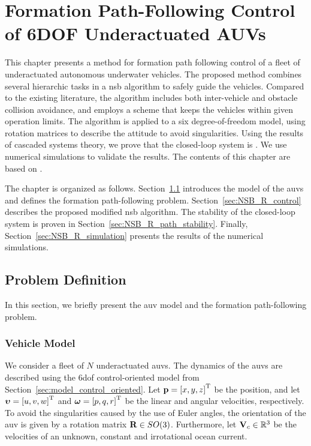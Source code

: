 \chapter{Formation Path-Following Control of 6DOF Underactuated AUVs}
\label{chap:NSB_R}

This chapter presents a method for formation path following control of a fleet of underactuated autonomous underwater vehicles.
The proposed method combines several hierarchic tasks in a \acrlong{nsb} algorithm to safely guide the vehicles.
Compared to the existing literature, the algorithm includes both inter-vehicle and obstacle collision avoidance, and employs a scheme that keeps the vehicles within given operation limits.
The algorithm is applied to a six degree-of-freedom model, using rotation matrices to describe the attitude to avoid singularities.
Using the results of cascaded systems theory, we prove that the closed-loop system is .
We use numerical simulations to validate the results.
The contents of this chapter are based on \cite{matous_singularity_2023}.

The chapter is organized as follows.
Section~\ref{sec:NSB_R_problem} introduces the model of the \glspl{auv} and defines the formation path-following problem.
Section~\ref{sec:NSB_R_control} describes the proposed modified \gls{nsb} algorithm.
The stability of the closed-loop system is proven in Section~\ref{sec:NSB_R_path_stability}.
Finally, Section~\ref{sec:NSB_R_simulation} presents the results of the numerical simulations.

\section{Problem Definition}
\label{sec:NSB_R_problem}
In this section, we briefly present the \gls{auv} model and the formation path-following problem.

\subsection{Vehicle Model}
We consider a fleet of $N$ underactuated \glspl{auv}.
The dynamics of the \glspl{auv} are described using the 6\gls{dof} control-oriented model from Section~\ref{sec:model_control_oriented}.
Let $\mathbf{p} = \left[x, y, z\right]^{\mathrm{T}}$ be the position, and let $\bm{\upsilon} = \left[u, v, w\right]^{\mathrm{T}}$ and $\bm{\omega} = \left[p, q, r\right]^{\mathrm{T}}$ be the linear and angular velocities, respectively.
To avoid the singularities caused by the use of Euler angles, the orientation of the \gls{auv} is given by a rotation matrix $\mathbf{R} \in SO(3)$.
Furthermore, let $\mathbf{V}_c \in \mathbb{R}^3$ be the velocities of an unknown, constant and irrotational ocean current.

